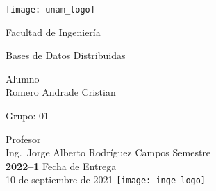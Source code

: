 \begin{titlepage}
  \centering
    \texttt{[image: unam\_logo]}\vspace{0.5cm}

    {\scshape{\Huge Facultad de Ingeniería\par{}}}\vspace{0.25cm}

    {\scshape{\Large Bases de Datos Distribuidas\par{}}}\vfill{}


    {\huge \textbf{\tituloPractica{}}}\vfill{}


    {\Large Alumno\\Romero Andrade Cristian}\vfill{}

      {\large Grupo: 01\par{}}\vfill{}

    {\large Profesor\\Ing.~Jorge Alberto Rodríguez Campos}\vfill{}
    \vfil{}
    {\large Semestre\\\textbf{2022--1}}
    \vfill{}
    {\large Fecha de Entrega\\10 de septiembre de 2021}
    \vfill{}
    \texttt{[image: inge\_logo]}

\end{titlepage}
